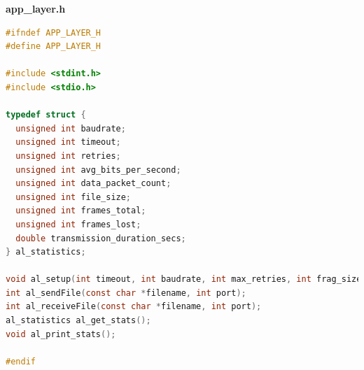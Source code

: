 \documentclass[11pt]{article}
\begin{document}
\newpage
\thispagestyle{fancy}
\fancyhf{}
\fancyfoot[R]{\thepage}
\renewcommand*{\footrulewidth}{1pt}
\textbf{app\_layer.h}
\begin{lstlisting}[language=C]
#ifndef APP_LAYER_H
#define APP_LAYER_H

#include <stdint.h>
#include <stdio.h>

typedef struct {
  unsigned int baudrate;
  unsigned int timeout;
  unsigned int retries;
  unsigned int avg_bits_per_second;
  unsigned int data_packet_count;
  unsigned int file_size;
  unsigned int frames_total;
  unsigned int frames_lost;
  double transmission_duration_secs;
} al_statistics;

void al_setup(int timeout, int baudrate, int max_retries, int frag_size);
int al_sendFile(const char *filename, int port);
int al_receiveFile(const char *filename, int port);
al_statistics al_get_stats();
void al_print_stats();

#endif


\end{lstlisting}
\end{document}
